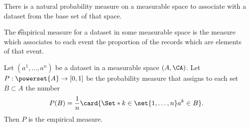 

There is a natural probability measure on a measurable space to associate with a dataset from the base set of that space.


The \t{empirical measure} for a dataset in some measurable space is the measure which associates to each event the proportion of the records which are elements of that event.


Let $(a^1, \dots, a^n)$ be a dataset in a measurable space $(A, \CA)$.
Let $P: \powerset{A} \to [0, 1]$ be the probability measure that assigns to each set $B \subset A$ the number
$$
  P(B) = \frac{1}{n} \card{\Set*{k \in \set{1, \dots, n}}{a^k \in B}}.
$$
Then $P$ is the empirical measure.

\blankpage
